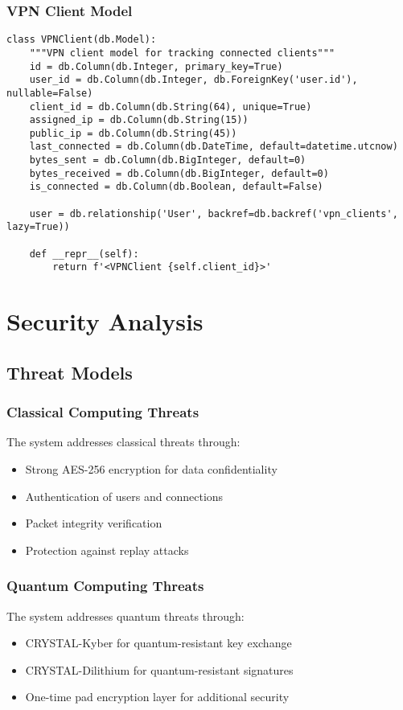 \documentclass[12pt,a4paper]{report}
\begin{document}
\subsection{VPN Client Model}
\begin{lstlisting}[style=python, caption=VPN Client Model Implementation]
class VPNClient(db.Model):
    """VPN client model for tracking connected clients"""
    id = db.Column(db.Integer, primary_key=True)
    user_id = db.Column(db.Integer, db.ForeignKey('user.id'), nullable=False)
    client_id = db.Column(db.String(64), unique=True)
    assigned_ip = db.Column(db.String(15))
    public_ip = db.Column(db.String(45))
    last_connected = db.Column(db.DateTime, default=datetime.utcnow)
    bytes_sent = db.Column(db.BigInteger, default=0)
    bytes_received = db.Column(db.BigInteger, default=0)
    is_connected = db.Column(db.Boolean, default=False)
    
    user = db.relationship('User', backref=db.backref('vpn_clients', lazy=True))
    
    def __repr__(self):
        return f'<VPNClient {self.client_id}>'
\end{lstlisting}

\chapter{Security Analysis}
\section{Threat Models}
\subsection{Classical Computing Threats}
The system addresses classical threats through:
\begin{itemize}
    \item Strong AES-256 encryption for data confidentiality
    \item Authentication of users and connections
    \item Packet integrity verification
    \item Protection against replay attacks
\end{itemize}

\subsection{Quantum Computing Threats}
The system addresses quantum threats through:
\begin{itemize}
    \item CRYSTAL-Kyber for quantum-resistant key exchange
    \item CRYSTAL-Dilithium for quantum-resistant signatures
    \item One-time pad encryption layer for additional security
\end{itemize}
\end{document}
